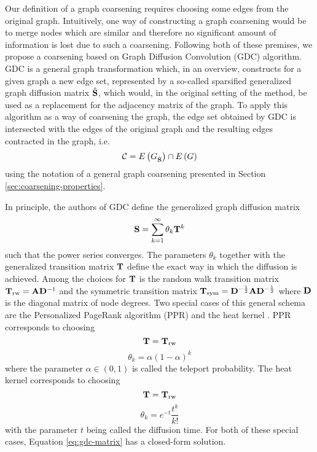 Our definition of a graph coarsening requires choosing some edges from the original graph. Intuitively, one way of constructing a graph coarsening would be to merge nodes which are similar and therefore no significant amount of information is lost due to such a coarsening. Following both of these premises, we propose a coarsening based on Graph Diffusion Convolution (GDC) \cite{gasteiger_diffusion_2019} algorithm. GDC is a general graph transformation which, in an overview, constructs for a given graph a new edge set, represented by a so-called sparsified generalized graph diffusion matrix \( \hat{\mathbf{S}} \), which would, in the original setting of the method, be used as a replacement for the adjacency matrix of the graph. To apply this algorithm as a way of coarsening the graph, the edge set obtained by GDC is intersected with the edges of the original graph and the resulting edges contracted in the graph, i.e.
\[ \mathcal{C} = E \left( G_{\hat{\mathbf{S}}} \right) \cap E \left( G \right) \]
using the notation of a general graph coarsening presented in Section \ref{sec:coarsening-properties}.

In principle, the authors of GDC define the generalized graph diffusion matrix
\begin{equation}\label{eq:gdc-matrix}
    \mathbf{S} = \sum_{k = 1}^\infty \theta_k \mathbf{T}^k
\end{equation}
such that the power series converges. The parameters \( \theta_k \) together with the generalized transition matrix \( \mathbf{T} \) define the exact way in which the diffusion is achieved. Among the choices for \( \mathbf{T} \) is the random walk transition matrix \( \mathbf{T}_ \mathrm{rw} = \mathbf{A} \mathbf{D}^{-1} \) and the symmetric transition matrix \( \mathbf{T}_\mathrm{sym} = \mathbf{D}^{-\frac{1}{2}} \mathbf{A} \mathbf{D}^{-\frac{1}{2}} \) where \( \mathbf{D} \) is the diagonal matrix of node degrees. Two special cases of this general schema are the Personalized PageRank algorithm (PPR) \cite{page_pagerank_1999} and the heat kernel \cite{kondor_diffusion_2002}. PPR corresponds to choosing
\[ \mathbf{T} = \mathbf{T}_\mathrm{rw} \]
\[ \theta_k = \alpha \left( 1 - \alpha \right)^k \]
where the parameter \( \alpha \in \left( 0, 1 \right) \) is called the teleport probability. The heat kernel corresponds to choosing
\[ \mathbf{T} = \mathbf{T}_\mathrm{rw} \]
\[ \theta_k = e^{-t} \frac{t^k}{k!} \]
with the parameter \( t \) being called the diffusion time. For both of these special cases, Equation \ref{eq:gdc-matrix} has a closed-form solution.

